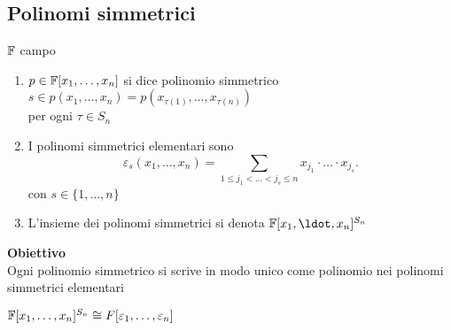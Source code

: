 \documentclass[12px]{article}
\begin{document}
\subsection{Polinomi simmetrici}
\begin{defi}
	$\mathbb{F}$ campo\\
	\begin{enumerate}
		\item $p\in \mathbb{F}[x_1,\ldots, x_n]$ si dice polinomio simmetrico\\
			$s\in p(x_1,\ldots,x_n) = p(x_{\tau(1)},\ldots,x_{\tau(n)})$ \\
			per ogni $\tau\in S_n$
		\item I polinomi simmetrici elementari sono 
			 \[
				 \varepsilon_s(x_1,\ldots,x_n) = \sum_{1 \leq j_1 < \ldots< j_s \leq n} x_{j_1}\cdot\ldots\cdot x_{j_s}
			 .\]  con $s\in \{1,\ldots,n\}$ 
		 \item L'insieme dei polinomi simmetrici si denota $\F[x_1,\ldot,x_n]^{S_n}$
	\end{enumerate}
\end{defi}
\textbf{Obiettivo}\\
Ogni polinomio simmetrico si scrive in modo unico come polinomio nei polinomi simmetrici elementari
\begin{teo}
	$\mathbb{F}[x_1,\ldots,x_n]^{S_n}\cong F[\varepsilon_1, \ldots, \varepsilon_n]$
\end{teo}
\end{document}
